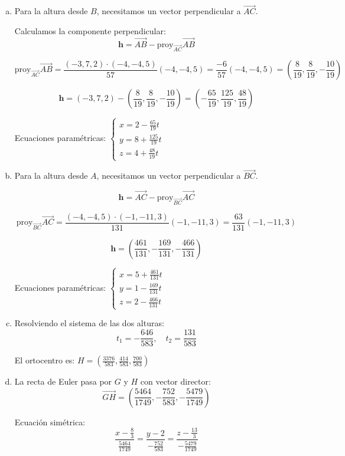 \begin{prob}
\begin{myproof}
\begin{enumerate}[a)]
\item Para la altura desde $B$, necesitamos un vector perpendicular a $\overrightarrow{AC}$.

Calculamos la componente perpendicular:
$$\mathbf{h} = \overrightarrow{AB} - \text{proy}_{\overrightarrow{AC}}\overrightarrow{AB}$$

$$\text{proy}_{\overrightarrow{AC}}\overrightarrow{AB} = \frac{(-3,7,2) \cdot (-4,-4,5)}{57}(-4,-4,5) = \frac{-6}{57}(-4,-4,5) = \left(\frac{8}{19}, \frac{8}{19}, -\frac{10}{19}\right)$$

$$\mathbf{h} = (-3,7,2) - \left(\frac{8}{19}, \frac{8}{19}, -\frac{10}{19}\right) = \left(-\frac{65}{19}, \frac{125}{19}, \frac{48}{19}\right)$$

Ecuaciones paramétricas: $\boxed{\left\{\begin{matrix}
x = 2 - \frac{65}{19}t\\
y = 8 + \frac{125}{19}t\\
z = 4 + \frac{48}{19}t
\end{matrix}\right.}$

\item Para la altura desde $A$, necesitamos un vector perpendicular a $\overrightarrow{BC}$.

$$\mathbf{h} = \overrightarrow{AC} - \text{proy}_{\overrightarrow{BC}}\overrightarrow{AC}$$

$$\text{proy}_{\overrightarrow{BC}}\overrightarrow{AC} = \frac{(-4,-4,5) \cdot (-1,-11,3)}{131}(-1,-11,3) = \frac{63}{131}(-1,-11,3)$$

$$\mathbf{h} = \left(\frac{461}{131}, -\frac{169}{131}, -\frac{466}{131}\right)$$

Ecuaciones paramétricas: $\boxed{\left\{\begin{matrix}
x = 5 + \frac{461}{131}t\\
y = 1 - \frac{169}{131}t\\
z = 2 - \frac{466}{131}t
\end{matrix}\right.}$

\item Resolviendo el sistema de las dos alturas:
$$t_1 = -\frac{646}{583}, \quad t_2 = \frac{131}{583}$$

El ortocentro es: $\boxed{H = \left(\frac{3376}{583}, \frac{414}{583}, \frac{700}{583}\right)}$

\item La recta de Euler pasa por $G$ y $H$ con vector director:
$$\overrightarrow{GH} = \left(\frac{5464}{1749}, -\frac{752}{583}, -\frac{5479}{1749}\right)$$

Ecuación simétrica:
$$\boxed{\frac{x-\frac{8}{3}}{\frac{5464}{1749}} = \frac{y-2}{-\frac{752}{583}} = \frac{z-\frac{13}{3}}{-\frac{5479}{1749}}}$$
\end{enumerate}
\end{myproof}
\end{prob}

